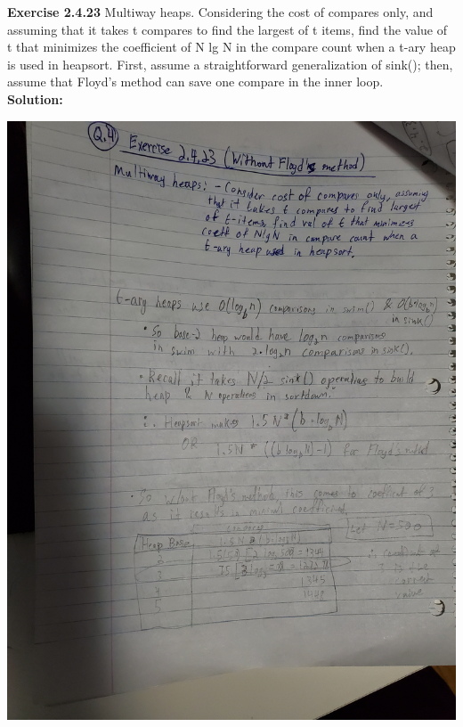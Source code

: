 \documentclass[11pt,fleqn]{article}
\begin{document}
\textbf{Exercise 2.4.23} Multiway heaps. Considering the cost of compares only, and assuming that
it takes t compares to find the largest of t items, find the value of t that minimizes the
coefficient of N lg N in the compare count when a t-ary heap is used in heapsort. First,
assume a straightforward generalization of sink(); then, assume that Floyd’s method
can save one compare in the inner loop.\\

\textbf{Solution:}
\begin{center}
	\includegraphics[scale=.1]{2.4.23.jpg}
\end{center}
\end{document}
